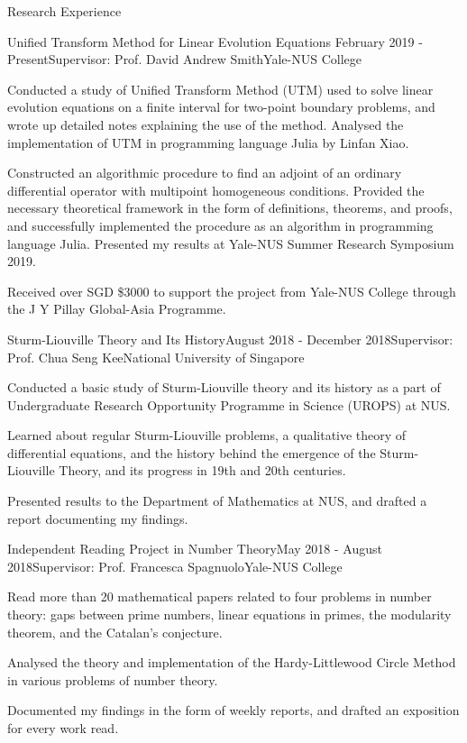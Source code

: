 \documentclass{resume} %
\begin{document}
\begin{rSection}{Research Experience}

\begin{rSubsection}{Unified Transform Method for Linear Evolution Equations }{February 2019 - Present}{Supervisor: Prof. David Andrew Smith}{Yale-NUS College}
\item Conducted a study of Unified Transform Method (UTM) used to solve linear evolution equations on a finite interval for two-point boundary problems, and wrote up detailed notes explaining the use of the method. Analysed the implementation of UTM in programming language Julia by Linfan Xiao.
\item Constructed an algorithmic procedure to find an adjoint of an ordinary differential operator with multipoint homogeneous conditions. Provided the necessary theoretical framework in the form of definitions, theorems, and proofs, and successfully implemented the procedure as an algorithm in programming language Julia. Presented my results at Yale-NUS Summer Research Symposium 2019.
\item Received over SGD \$3000 to support the project from Yale-NUS College through the J Y Pillay Global-Asia Programme. 
\end{rSubsection}

\begin{rSubsection}{Sturm-Liouville Theory and Its History}{August 2018 - December 2018}{Supervisor: Prof. Chua Seng Kee}{National University of Singapore}
\item Conducted a basic study of Sturm-Liouville theory and its history as a part of Undergraduate Research Opportunity Programme in Science (UROPS) at NUS.
\item Learned about regular Sturm-Liouville problems, a qualitative theory of differential equations, and the history behind the emergence of the Sturm-Liouville Theory, and its progress in 19th and 20th centuries.
\item Presented results to the Department of Mathematics at NUS, and drafted a report documenting my findings. 
\end{rSubsection}

\begin{rSubsection}{Independent Reading Project in Number Theory}{May 2018 - August 2018}{Supervisor: Prof. Francesca Spagnuolo}{Yale-NUS College}
\item Read more than 20 mathematical papers related to four problems in number theory: gaps between prime numbers, linear equations in primes, the modularity theorem, and the Catalan's conjecture.
\item Analysed the theory and implementation of the Hardy-Littlewood Circle Method in various problems of number theory.
\item Documented my findings in the form of weekly reports, and drafted an exposition for every work read.
\end{rSubsection}

\end{rSection}
\end{document}
